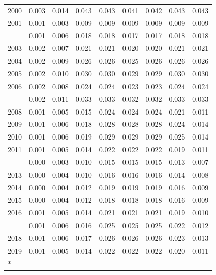 \documentclass[
]{article}
\begin{document}
\begin{longtable}[t]{lrrrrrrrr}
2000 & 0.003 & 0.014 & 0.043 & 0.043 & 0.041 & 0.042 & 0.043 & 0.043\\
2001 & 0.001 & 0.003 & 0.009 & 0.009 & 0.009 & 0.009 & 0.009 & 0.009\\
\addlinespace
2002 & 0.001 & 0.006 & 0.018 & 0.018 & 0.017 & 0.017 & 0.018 & 0.018\\
2003 & 0.002 & 0.007 & 0.021 & 0.021 & 0.020 & 0.020 & 0.021 & 0.021\\
2004 & 0.002 & 0.009 & 0.026 & 0.026 & 0.025 & 0.026 & 0.026 & 0.026\\
2005 & 0.002 & 0.010 & 0.030 & 0.030 & 0.029 & 0.029 & 0.030 & 0.030\\
2006 & 0.002 & 0.008 & 0.024 & 0.024 & 0.023 & 0.023 & 0.024 & 0.024\\
\addlinespace
2007 & 0.002 & 0.011 & 0.033 & 0.033 & 0.032 & 0.032 & 0.033 & 0.033\\
2008 & 0.001 & 0.005 & 0.015 & 0.024 & 0.024 & 0.024 & 0.021 & 0.011\\
2009 & 0.001 & 0.006 & 0.018 & 0.028 & 0.028 & 0.028 & 0.024 & 0.014\\
2010 & 0.001 & 0.006 & 0.019 & 0.029 & 0.029 & 0.029 & 0.025 & 0.014\\
2011 & 0.001 & 0.005 & 0.014 & 0.022 & 0.022 & 0.022 & 0.019 & 0.011\\
\addlinespace
2012 & 0.000 & 0.003 & 0.010 & 0.015 & 0.015 & 0.015 & 0.013 & 0.007\\
2013 & 0.000 & 0.004 & 0.010 & 0.016 & 0.016 & 0.016 & 0.014 & 0.008\\
2014 & 0.000 & 0.004 & 0.012 & 0.019 & 0.019 & 0.019 & 0.016 & 0.009\\
2015 & 0.000 & 0.004 & 0.012 & 0.018 & 0.018 & 0.018 & 0.016 & 0.009\\
2016 & 0.001 & 0.005 & 0.014 & 0.021 & 0.021 & 0.021 & 0.019 & 0.010\\
\addlinespace
2017 & 0.001 & 0.006 & 0.016 & 0.025 & 0.025 & 0.025 & 0.022 & 0.012\\
2018 & 0.001 & 0.006 & 0.017 & 0.026 & 0.026 & 0.026 & 0.023 & 0.013\\
2019 & 0.001 & 0.005 & 0.014 & 0.022 & 0.022 & 0.022 & 0.020 & 0.011\\*
\end{longtable}
\end{document}
